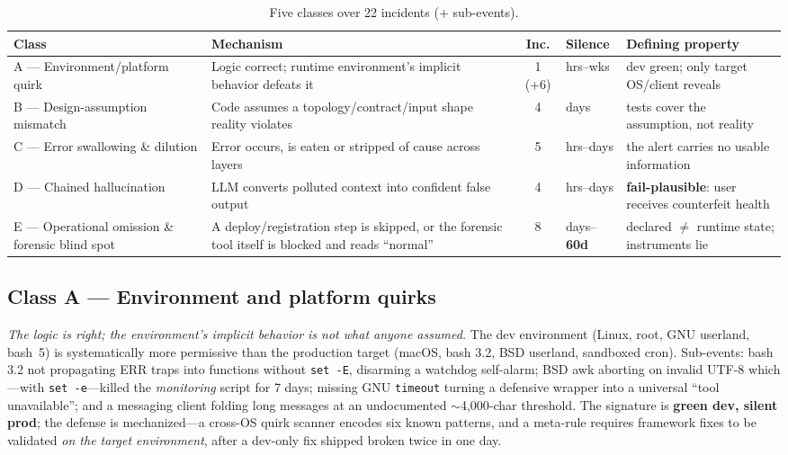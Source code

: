 \documentclass[conference]{IEEEtran}
\begin{document}
\begin{table}[t]
\centering
\caption{Five classes over 22 incidents (+ sub-events).}
\label{tab:taxonomy}
\footnotesize
\begin{tabular}{@{}p{2.4cm}p{5.2cm}cp{1.6cm}p{4.4cm}@{}}
\toprule
\textbf{Class} & \textbf{Mechanism} & \textbf{Inc.} & \textbf{Silence} & \textbf{Defining property}\\
\midrule
A --- Environment/platform quirk & Logic correct; runtime environment's implicit behavior defeats it & 1 (+6) & hrs--wks & dev green; only target OS/client reveals\\
B --- Design-assumption mismatch & Code assumes a topology/contract/input shape reality violates & 4 & days & tests cover the assumption, not reality\\
C --- Error swallowing \& dilution & Error occurs, is eaten or stripped of cause across layers & 5 & hrs--days & the alert carries no usable information\\
D --- Chained hallucination & LLM converts polluted context into confident false output & 4 & hrs--days & \textbf{fail-plausible}: user receives counterfeit health\\
E --- Operational omission \& forensic blind spot & A deploy/registration step is skipped, or the forensic tool itself is blocked and reads ``normal'' & 8 & days--\textbf{60d} & declared $\neq$ runtime state; instruments lie\\
\bottomrule
\end{tabular}
\end{table}

\subsection{Class A --- Environment and platform quirks}
\emph{The logic is right; the environment's implicit behavior is not what
anyone assumed.} The dev environment (Linux, root, GNU userland, bash~5)
is systematically more permissive than the production target (macOS, bash
3.2, BSD userland, sandboxed cron). Sub-events: bash 3.2 not propagating
ERR traps into functions without \texttt{set~-E}, disarming a watchdog
self-alarm; BSD awk aborting on invalid UTF-8 which---with
\texttt{set~-e}---killed the \emph{monitoring} script for 7 days; missing
GNU \texttt{timeout} turning a defensive wrapper into a universal ``tool
unavailable''; and a messaging client folding long messages at an
undocumented $\sim$4{,}000-char threshold. The signature is \textbf{green
dev, silent prod}; the defense is mechanized---a cross-OS quirk scanner
encodes six known patterns, and a meta-rule requires framework fixes to be
validated \emph{on the target environment}, after a dev-only fix shipped
broken twice in one day.
\end{document}
